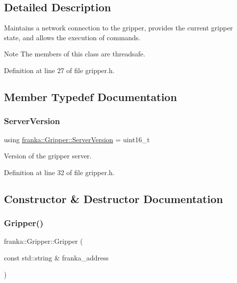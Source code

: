 \subsection{Detailed Description}
Maintains a network connection to the gripper, provides the current gripper state, and allows the execution of commands.

\begin{DoxyNote}{Note}
The members of this class are threadsafe. 
\end{DoxyNote}


Definition at line 27 of file gripper.\+h.



\subsection{Member Typedef Documentation}
\mbox{\label{classfranka_1_1Gripper_a613bf52d9433b733685d0fb9ea71602e}} 
\subsubsection{\texorpdfstring{Server\+Version}{ServerVersion}}
{\footnotesize\ttfamily using \hyperlink{classfranka_1_1Gripper_a613bf52d9433b733685d0fb9ea71602e}{franka\+::\+Gripper\+::\+Server\+Version} =  uint16\+\_\+t}

Version of the gripper server. 

Definition at line 32 of file gripper.\+h.



\subsection{Constructor \& Destructor Documentation}
\mbox{\label{classfranka_1_1Gripper_a02b30632b08001592c62d3563561afc5}} 
\subsubsection{\texorpdfstring{Gripper()}{Gripper()}\hspace{0.1cm}{\footnotesize\ttfamily [1/2]}}
{\footnotesize\ttfamily franka\+::\+Gripper\+::\+Gripper (\begin{DoxyParamCaption}\item[{const std\+::string \&}]{franka\+\_\+address }\end{DoxyParamCaption})\hspace{0.3cm}{\ttfamily [explicit]}}

